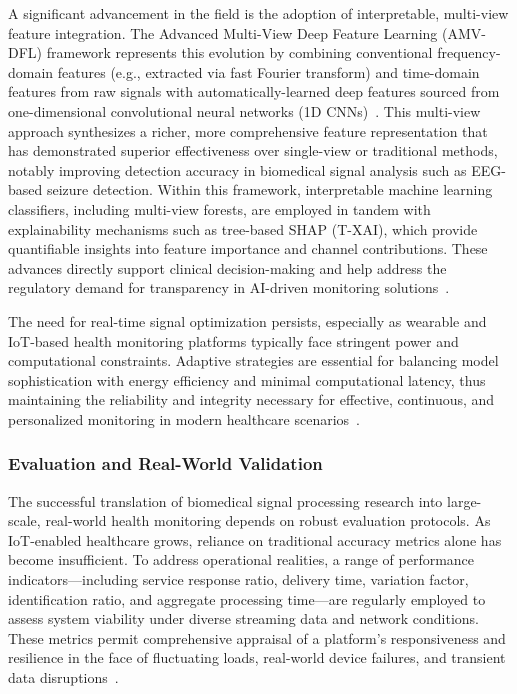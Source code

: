 \documentclass[sigconf]{acmart}
\begin{document}
A significant advancement in the field is the adoption of interpretable, multi-view feature integration. The Advanced Multi-View Deep Feature Learning (AMV-DFL) framework represents this evolution by combining conventional frequency-domain features (e.g., extracted via fast Fourier transform) and time-domain features from raw signals with automatically-learned deep features sourced from one-dimensional convolutional neural networks (1D CNNs)~\cite{ref98}. This multi-view approach synthesizes a richer, more comprehensive feature representation that has demonstrated superior effectiveness over single-view or traditional methods, notably improving detection accuracy in biomedical signal analysis such as EEG-based seizure detection. Within this framework, interpretable machine learning classifiers, including multi-view forests, are employed in tandem with explainability mechanisms such as tree-based SHAP (T-XAI), which provide quantifiable insights into feature importance and channel contributions. These advances directly support clinical decision-making and help address the regulatory demand for transparency in AI-driven monitoring solutions~\cite{ref98,ref107}.

The need for real-time signal optimization persists, especially as wearable and IoT-based health monitoring platforms typically face stringent power and computational constraints. Adaptive strategies are essential for balancing model sophistication with energy efficiency and minimal computational latency, thus maintaining the reliability and integrity necessary for effective, continuous, and personalized monitoring in modern healthcare scenarios~\cite{ref107}.

\subsubsection{Evaluation and Real-World Validation}

The successful translation of biomedical signal processing research into large-scale, real-world health monitoring depends on robust evaluation protocols. As IoT-enabled healthcare grows, reliance on traditional accuracy metrics alone has become insufficient. To address operational realities, a range of performance indicators—including service response ratio, delivery time, variation factor, identification ratio, and aggregate processing time—are regularly employed to assess system viability under diverse streaming data and network conditions. These metrics permit comprehensive appraisal of a platform’s responsiveness and resilience in the face of fluctuating loads, real-world device failures, and transient data disruptions~\cite{ref106}.
\end{document}

